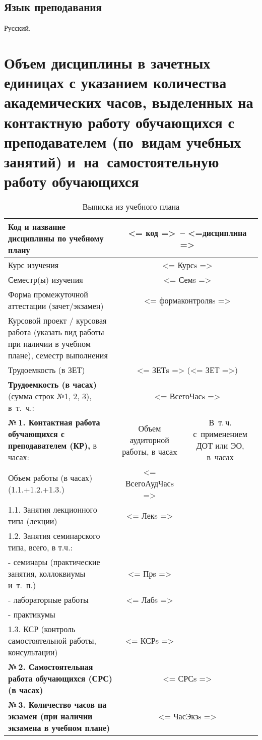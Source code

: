 \documentclass[a4paper,12pt]{article}
\begin{document}
\subsection{Язык преподавания} 
  Русский.
  



\newpage

\section{Объем дисциплины в зачетных единицах с указанием количества академических часов, выделенных на контактную работу обучающихся с преподавателем (по~видам учебных занятий) и~на~самостоятельную работу обучающихся}

\begin{table}[H]
\caption{Выписка из учебного плана} 
\begin{tabular}{|p{9cm}|c|c|}
\hline
Код и название дисциплины по учебному плану & \multicolumn{2}{p{6cm}|}{<= код =>\ -- <=дисциплина => }\\
\hline
Курс изучения &\multicolumn{2}{c|}{ <= Курсs => }\\
\hline
Семестр(ы) изучения &\multicolumn{2}{c|}{ <= Семs => }\\
\hline
Форма промежуточной аттестации (зачет/экзамен) &\multicolumn{2}{c|}{ <= формаконтроляs => }\\
\hline
Курсовой проект / курсовая работа (указать вид работы при наличии в учебном плане), семестр выполнения &\multicolumn{2}{c|}{ }\\
\hline
Трудоемкость (в ЗЕТ) &\multicolumn{2}{c|}{ <= ЗЕТs => (<= ЗЕТ =>) }\\
\hline
{\bf Трудоемкость (в часах)} (сумма строк №1, 2, 3), в~т.~ч.:& \multicolumn{2}{c|}{<= ВсегоЧасs =>}\\
\hline
\textbf{№\,1. Контактная работа обучающихся с преподавателем (КР),} в часах:
& \multicolumn{1}{p{3cm}|}{\centering Объем аудиторной работы, в часаx}
& \multicolumn{1}{p{3cm}|}{\centering\arraybackslash В~т.\,ч. с~применением ДОТ или ЭО, в~часах}\\
\hline  
Объем работы (в часах) (1.1.+1.2.+1.3.)& <= ВсегоАудЧасs => & \\
\hline
1.1. Занятия лекционного типа (лекции) & <= Лекs => & \\
\hline
1.2. Занятия семинарского типа, всего, в т.ч.: & & \\
\hline
- семинары (практические занятия, коллоквиумы и~т.~п.)  & <= Прs => & \\
\hline
- лабораторные работы& <= Лабs => & \\
\hline
- практикумы & & \\
\hline
1.3. КСР (контроль самостоятельной работы, консультации)& <= КСРs => & \\
\hline
{\bf №\,2. Самостоятельная работа обучающихся (СРС) (в часах)}& \multicolumn{2}{c|}{<= СРСs =>}\\
\hline
{\bf №\,3. Количество часов на экзамен (при наличии экзамена в учебном плане)}& \multicolumn{2}{c|}{<= ЧасЭкзs =>}\\
\hline
\end{tabular}
\end{table}
\end{document}
